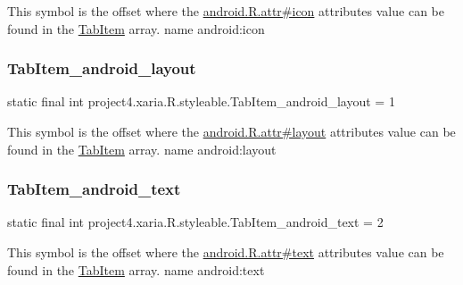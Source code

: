 This symbol is the offset where the \hyperlink{}{android.\+R.\+attr\#icon} attribute\textquotesingle{}s value can be found in the \hyperlink{classproject4_1_1xaria_1_1R_1_1styleable_aa9568e579aca04aeb8e914ce6277b875}{Tab\+Item} array.  name android\+:icon \mbox{\label{classproject4_1_1xaria_1_1R_1_1styleable_a4708f852a2b7a77a451d9c8a9d2cf9f0}} 
\subsubsection{\texorpdfstring{Tab\+Item\+\_\+android\+\_\+layout}{TabItem\_android\_layout}}
{\footnotesize\ttfamily static final int project4.\+xaria.\+R.\+styleable.\+Tab\+Item\+\_\+android\+\_\+layout = 1\hspace{0.3cm}{\ttfamily [static]}}

This symbol is the offset where the \hyperlink{}{android.\+R.\+attr\#layout} attribute\textquotesingle{}s value can be found in the \hyperlink{classproject4_1_1xaria_1_1R_1_1styleable_aa9568e579aca04aeb8e914ce6277b875}{Tab\+Item} array.  name android\+:layout \mbox{\label{classproject4_1_1xaria_1_1R_1_1styleable_a148413384f89d5627ea689b9ed1a8036}} 
\subsubsection{\texorpdfstring{Tab\+Item\+\_\+android\+\_\+text}{TabItem\_android\_text}}
{\footnotesize\ttfamily static final int project4.\+xaria.\+R.\+styleable.\+Tab\+Item\+\_\+android\+\_\+text = 2\hspace{0.3cm}{\ttfamily [static]}}

This symbol is the offset where the \hyperlink{}{android.\+R.\+attr\#text} attribute\textquotesingle{}s value can be found in the \hyperlink{classproject4_1_1xaria_1_1R_1_1styleable_aa9568e579aca04aeb8e914ce6277b875}{Tab\+Item} array.  name android\+:text \mbox{\label{classproject4_1_1xaria_1_1R_1_1styleable_ab6bfb1f97ae9fba16f4f90d50871d4a8}} 
